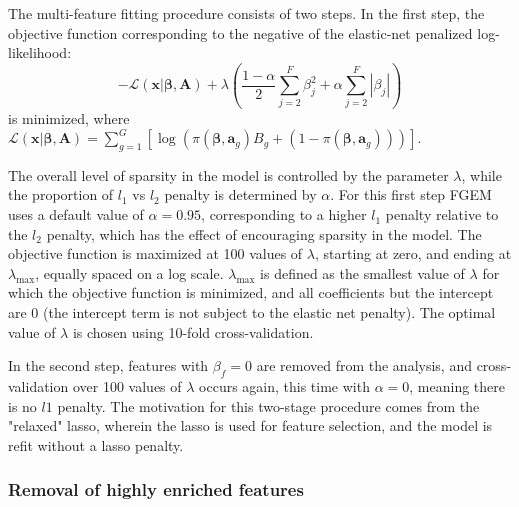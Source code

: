 The multi-feature fitting procedure consists of two steps.  In the first step, the objective function corresponding to the negative of the elastic-net penalized log-likelihood:
$$ -\mathcal{L}(\textbf{x}|\boldsymbol{\beta},\textbf{A}) + \lambda\left( \frac{1-\alpha}{2} \sum_{j=2}^F\beta_j^2 + \alpha \sum_{j=2}^F|\beta_j| \right) $$
is minimized, where \(\mathcal{L}(\textbf{x}|\boldsymbol{\beta},\textbf{A}) = \sum_{g=1}^{G}[\log\left(\pi(\boldsymbol{\beta},\textbf{a}_g)B_g+(1-\pi(\boldsymbol{\beta},\textbf{a}_g))\right)]\).
 

The overall level of sparsity in the model is controlled by the parameter \(\lambda\), while the proportion of \(l_1\) vs \(l_2\) penalty is determined by \(\alpha\).  For this first step FGEM uses a default value of $\alpha=0.95$, corresponding to a higher $l_{\text{1}}$ penalty relative to the $l_{\text{2}}$ penalty, which has the effect of encouraging sparsity in the model. The objective function is maximized at 100 values of \(\lambda\), starting at zero, and ending at \(\lambda_{\text{max}}\), equally spaced on a log scale.  \(\lambda_{\text{max}}\) is defined as the smallest value of \(\lambda\) for which the objective function is minimized, and all coefficients but the intercept are 0 (the intercept term is not subject to the elastic net penalty). The optimal value of \(\lambda\) is chosen using 10-fold cross-validation.  

In the second step, features with \(\beta_f=0\) are removed from the analysis, and cross-validation over 100 values of \(\lambda\) occurs again, this time with \(\alpha = 0\), meaning there is no \(l1\) penalty.  The motivation for this two-stage
procedure comes from the "relaxed" lasso\cite{hastie17_exten_compar_best_subset_selec}, wherein the lasso is used for feature selection, and the model is refit without a lasso penalty.  

\subsubsection{Removal of highly enriched features}\label{sec:org02cff25}

